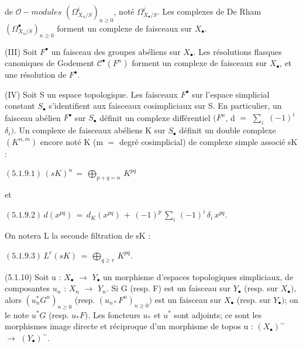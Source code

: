 \documentclass[11pt,twoside]{article}
\newcommand{\DFormula}[1]{%
  \par\smallskip\noindent\hspace*{0pt}\(\displaystyle #1\)\par\smallskip
}
\begin{document}
de \(\mathcal{O}-modules\) \((\Omega ^{i}_{X_{n}/S})_{n\geq 0}\), noté \(\Omega ^{i}_{X_{\bullet }/S}\). Les complexes de De Rham \((\Omega ^{\bullet }_{X_{n}/S})_{n\geq 0}\) forment un complexe de faisceaux sur \(X_{\bullet }\).\par
\par\medskip
(III) Soit \(F^{\bullet }\) un faisceau des groupes abéliens sur \(X_{\bullet }\). Les résolutions flasques canoniques de Godement \(\mathcal{C}^{\bullet }(F^{n})\) forment un complexe de faisceaux sur \(X_{\bullet }\), et une résolution de \(F^{\bullet }\).\par
\par\medskip
(IV) Soit S un espace topologique. Les faisceaux \(F^{\bullet }\) sur l’espace simplicial constant \(S_{\bullet }\) s’identifient aux faisceaux cosimpliciaux sur S. En particulier, un faisceau abélien \(F^{\bullet }\) sur \(S_{\bullet }\) définit un complexe différentiel \((F^{n}\), d \(=\) \(\sum _{i}\) \((−1)^{i}\) \(\delta _{i})\). Un complexe de faisceaux abéliens K sur \(S_{\bullet }\) définit un double complexe \((K^{n,m})\) encore noté K (m \(=\) degré cosimplicial) de complexe simple associé sK :\par
\par\medskip
\DFormula{(5.1.9.1)\,(sK)^{n}\,=\,⨁_{p+q=n}\,K^{pq}}
\par\medskip
et\par
\par\medskip
\DFormula{(5.1.9.2)\,d(x^{pq})\,=\,d_{K}(x^{pq})\,+\,(−1)^{p}\,\sum _{i}\,(−1)^{i}\,\delta _{i}\,x^{pq}.}
\par\medskip
On notera L la seconde filtration de sK :\par
\par\medskip
\DFormula{(5.1.9.3)\,L^{r}(sK)\,=\,⨁_{q\geq r}\,K^{pq}.}
\par\medskip
(5.1.10) Soit u : \(X_{\bullet }\) \(\to \) \(Y_{\bullet }\) un morphisme d’espaces topologiques simpliciaux, de composantes \(u_{n}\) : \(X_{n}\) \(\to \) \(Y_{n}\). Si G (resp. F) est un faisceau sur \(Y_{\bullet }\) (resp. sur \(X_{\bullet })\), alors \((u_{n}^{\ast }G^{n})_{n\geq 0}\) (resp. \((u_{n\ast }F^{n})_{n\geq 0})\) est un faisceau sur \(X_{\bullet }\) (resp. sur \(Y_{\bullet })\); on le note \(u^{\ast }G\) (resp. \(u_{\ast }F)\). Les foncteurs \(u_{\ast }\) et \(u^{\ast }\) sont adjoints; ce sont les morphismes image directe et réciproque d’un morphisme de topos u : \((X_{\bullet })^{\sim }\) \(\to \) \((Y_{\bullet })^{\sim }\).\par
\par\medskip
\end{document}
